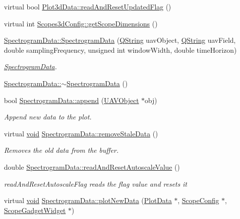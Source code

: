 \begin{DoxyCompactItemize}
\item 
virtual bool \hyperlink{group___scope_plugin_ga3d0789d96a38bc51e7e1be13754ba43e}{\-Plot3d\-Data\-::read\-And\-Reset\-Updated\-Flag} ()
\item 
virtual int \hyperlink{group___scope_plugin_ga19f02e368a922611f86005f7e18f12bf}{\-Scopes3d\-Config\-::get\-Scope\-Dimensions} ()
\item 
\hyperlink{group___scope_plugin_gaaac18b4298b3bb722d59928336254cd1}{\-Spectrogram\-Data\-::\-Spectrogram\-Data} (\hyperlink{group___u_a_v_objects_plugin_gab9d252f49c333c94a72f97ce3105a32d}{\-Q\-String} uav\-Object, \hyperlink{group___u_a_v_objects_plugin_gab9d252f49c333c94a72f97ce3105a32d}{\-Q\-String} uav\-Field, double sampling\-Frequency, unsigned int window\-Width, double time\-Horizon)
\begin{DoxyCompactList}\small\item\em \hyperlink{class_spectrogram_data}{\-Spectrogram\-Data}. \end{DoxyCompactList}\item 
\hyperlink{group___scope_plugin_gafe709b6e448db73f8548bc2b76f27d19}{\-Spectrogram\-Data\-::$\sim$\-Spectrogram\-Data} ()
\item 
bool \hyperlink{group___scope_plugin_gab2c059e5c5dea398eed663062df84fb6}{\-Spectrogram\-Data\-::append} (\hyperlink{class_u_a_v_object}{\-U\-A\-V\-Object} $\ast$obj)
\begin{DoxyCompactList}\small\item\em \-Append new data to the plot. \end{DoxyCompactList}\item 
virtual \hyperlink{group___u_a_v_objects_plugin_ga444cf2ff3f0ecbe028adce838d373f5c}{void} \hyperlink{group___scope_plugin_ga6e71a34a3e6d00b99845ac4cdfabdde9}{\-Spectrogram\-Data\-::remove\-Stale\-Data} ()
\begin{DoxyCompactList}\small\item\em \-Removes the old data from the buffer. \end{DoxyCompactList}\item 
double \hyperlink{group___scope_plugin_ga5adb8d57b4829f746f7437380b663d72}{\-Spectrogram\-Data\-::read\-And\-Reset\-Autoscale\-Value} ()
\begin{DoxyCompactList}\small\item\em read\-And\-Reset\-Autoscale\-Flag reads the flag value and resets it \end{DoxyCompactList}\item 
virtual \hyperlink{group___u_a_v_objects_plugin_ga444cf2ff3f0ecbe028adce838d373f5c}{void} \hyperlink{group___scope_plugin_gadfdece3155868e0a61b6a481a663be74}{\-Spectrogram\-Data\-::plot\-New\-Data} (\hyperlink{class_plot_data}{\-Plot\-Data} $\ast$, \hyperlink{class_scope_config}{\-Scope\-Config} $\ast$, \hyperlink{class_scope_gadget_widget}{\-Scope\-Gadget\-Widget} $\ast$)

\end{DoxyCompactItemize}
